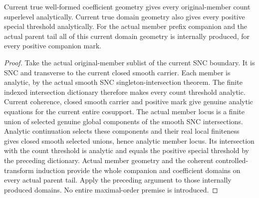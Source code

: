 \begin{lemma}
\label{hir:member-companion-positive-analyticity}
\leanok
Current true well-formed coefficient geometry gives every original-member
count superlevel analytically. Current true domain geometry also gives every
positive special threshold analytically. For the actual member prefix companion
and the actual parent tail all of this current domain geometry is internally
produced, for every positive companion mark.
\end{lemma}
\begin{proof}
Take the actual original-member sublist of the current SNC boundary. It is SNC
and transverse to the current closed smooth carrier. Each member is analytic,
by the actual smooth SNC singleton-intersection theorem. The finite indexed
intersection dictionary therefore makes every count threshold analytic.
Current coherence, closed smooth carrier and positive mark give genuine
analytic equations for the current entire cosupport. The actual member locus
is a finite union of selected genuine global components of the smooth SNC
intersections. Analytic continuation selects these components and their real
local finiteness gives closed smooth selected unions, hence analytic member
locus. Its intersection with the count threshold is analytic and equals the
positive special threshold by the preceding dictionary. Actual member geometry
and the coherent controlled-transform induction provide the whole companion
and coefficient domains on every actual parent tail. Apply the preceding
argument to those internally produced domains. No entire maximal-order
premise is introduced.
\end{proof}

